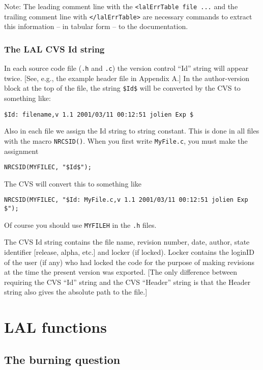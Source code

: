 \documentclass[]{ligodcc}
\begin{document}
Note: The leading comment line with the {\tt <lalErrTable file ...}
and the trailing comment line with {\tt </lalErrTable>} are necessary
commands to extract this information -- in tabular form -- to the
documentation.

\subsubsection{The LAL CVS Id string}

In each source code file ({\tt .h} and  {\tt .c}) the version control ``Id''
string will appear  twice.  [See, e.g., the example header file in
Appendix A.] In the author-version block at the top of the file, the
string {\tt \$\relax Id\$} will be converted
by the CVS to something like:

\noindent
{\tt \$\relax Id: filename,v 1.1 2001/03/11 00:12:51 jolien Exp \$}

\noindent
Also in each file we assign the Id string to string constant. This is
done in all files with the macro
{\tt NRCSID()}.  When you first write {\tt MyFile.c},  you must make the assignment

\noindent
{\tt NRCSID(MYFILEC, "\$\relax Id\$");}

\noindent
The CVS will convert this to something like

\noindent
{\tt NRCSID(MYFILEC, "\$\relax Id: MyFile.c,v 1.1 2001/03/11 00:12:51 jolien Exp \$");}

\noindent
Of course you should use {\tt MYFILEH} in the {\tt .h} files.

The  CVS Id  string contains the  file name, revision number, date,
author, state identifier [release, alpha, etc.] and locker (if
locked). Locker contains the loginID of the user (if any) who had
locked the code for the purpose of making revisions at the time the
present version was exported. [The only difference between requiring
the CVS  ``Id'' string and the CVS ``Header'' string is that the Header
string also gives the absolute path to the file.]

\section{LAL functions}
\label{sec:lalfunctions}
\subsection{The burning question}
\end{document}
